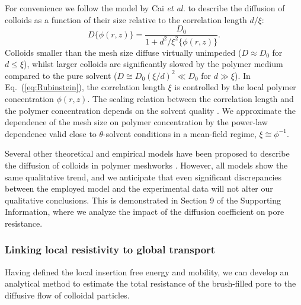 \documentclass[12pt, a4paper]{article}
\begin{document}
For convenience we follow the model by Cai \emph{et al.} \cite{Cai2011} to describe the diffusion of colloids as a function of their size relative to the correlation length $d / \xi$:
\begin{equation}
    D\{\phi(r,z)\} = \frac{D_0}{1+d^2/\xi^{2}\{\phi(r,z)\}}.
    \label{eq:Rubinstein}
\end{equation}
Colloids smaller than the mesh size diffuse virtually unimpeded ($D \approx D_0$ for $d\leq \xi$), whilst larger colloids are significantly slowed by the polymer medium compared to the pure solvent ($D\cong D_0 (\xi/d)^2\ll D_0$ for $d\gg \xi$).
In Eq.~(\ref{eq:Rubinstein}), the correlation length $\xi$ is controlled by the local polymer concentration $\phi(r,z)$.
The scaling relation between the correlation length and the polymer concentration depends on the solvent quality \cite{DeGennes1979}.
We approximate the dependence of the mesh size on polymer concentration by the power-law dependence valid close to $\theta$-solvent conditions in a mean-field regime, $\xi\cong \phi^{-1}$.

Several other theoretical and empirical models have been proposed to describe the diffusion of colloids in polymer meshworks \cite{Kohli2012,Holyst2009,Phillies1988}.
However, all models show the same qualitative trend, and we anticipate that even significant discrepancies between the employed model and the experimental data will not alter our qualitative conclusions.
This is demonstrated in Section 9 of the Supporting Information, where we analyze the impact of the diffusion coefficient on pore resistance.



\subsubsection{Linking local resistivity to global transport}


Having defined the local insertion free energy and mobility, we can develop an analytical method to estimate the total resistance of the brush-filled pore to the diffusive flow of colloidal particles.
\end{document}
